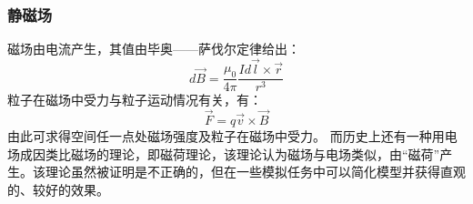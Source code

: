 \documentclass[UTF-8,cs4size]{ctexart}
\begin{document}
\subsubsection{静磁场}
磁场由电流产生，其值由毕奥——萨伐尔定律给出：
\begin{equation}
	d\vec{B} = \frac{\mu_0}{4\pi}\frac{Id\vec{l}\times\vec{r}}{r^3}
\end{equation}
粒子在磁场中受力与粒子运动情况有关，有：
\begin{equation}
	\vec{F} = q\vec{v}\times\vec{B}
\end{equation}
由此可求得空间任一点处磁场强度及粒子在磁场中受力。
而历史上还有一种用电场成因类比磁场的理论，即磁荷理论，该理论认为磁场与电场类似，由“磁荷”产生。该理论虽然被证明是不正确的，但在一些模拟任务中可以简化模型并获得直观的、较好的效果。
\end{document}
